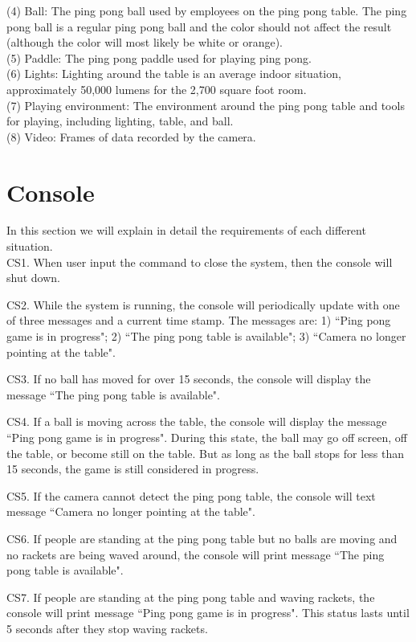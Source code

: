 \documentclass[11pt]{report}
\begin{document}
(4)	Ball: The ping pong ball used by employees on the ping pong table. The ping pong ball is a regular ping pong ball and the color should not affect the result (although the color will most likely be white or orange).\\
(5)	Paddle: The ping pong paddle used for playing ping pong.\\
(6)	Lights: Lighting around the table is an average indoor situation, approximately 50,000 lumens for the 2,700 square foot room.\\
(7)	Playing environment: The environment around the ping pong table and tools for playing, including lighting, table, and ball.\\
(8)	Video: Frames of data recorded by the camera.

\section{Console}
In this section we will explain in detail the requirements of each different situation.\\

CS1. When user input the command to close the system, then the console will shut down.

CS2. While the system is running, the console will periodically update with one of three messages and a current time stamp. The messages are: 1) ``Ping pong game is in progress"; 2) ``The ping pong table is available"; 3) ``Camera no longer pointing at the table".

CS3. If no ball has moved for over 15 seconds, the console will display the message ``The ping pong table is available".

CS4. If a ball is moving across the table, the console will display the message ``Ping pong game is in progress".  During this state, the ball may go off screen, off the table, or become still on the table.  But as long as the ball stops for less than 15 seconds, the game is still considered in progress.

CS5. If the camera cannot detect the ping pong table, the console will text message ``Camera no longer pointing at the table".

CS6. If people are standing at the ping pong table but no balls are moving and no rackets are being waved around, the console will print message ``The ping pong table is available".

CS7. If people are standing at the ping pong table and waving rackets, the console will print message ``Ping pong game is in progress".  This status lasts until 5 seconds after they stop waving rackets.
\end{document}
